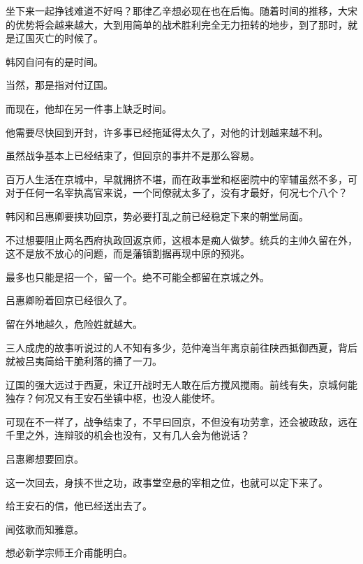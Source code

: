 坐下来一起挣钱难道不好吗？耶律乙辛想必现在也在后悔。随着时间的推移，大宋的优势将会越来越大，大到用简单的战术胜利完全无力扭转的地步，到了那时，就是辽国灭亡的时候了。

韩冈自问有的是时间。

当然，那是指对付辽国。

而现在，他却在另一件事上缺乏时间。

他需要尽快回到开封，许多事已经拖延得太久了，对他的计划越来越不利。

虽然战争基本上已经结束了，但回京的事并不是那么容易。

百万人生活在京城中，早就拥挤不堪，而在政事堂和枢密院中的宰辅虽然不多，可对于任何一名宰执高官来说，一个同僚就太多了，没有才最好，何况七个八个？

韩冈和吕惠卿要挟功回京，势必要打乱之前已经稳定下来的朝堂局面。

不过想要阻止两名西府执政回返京师，这根本是痴人做梦。统兵的主帅久留在外，这不是放不放心的问题，而是藩镇割据再现中原的预兆。

最多也只能是招一个，留一个。绝不可能全都留在京城之外。

吕惠卿盼着回京已经很久了。

留在外地越久，危险姓就越大。

三人成虎的故事听说过的人不知有多少，范仲淹当年离京前往陕西抵御西夏，背后就被吕夷简给干脆利落的捅了一刀。

辽国的强大远过于西夏，宋辽开战时无人敢在后方搅风搅雨。前线有失，京城何能独存？何况又有王安石坐镇中枢，也没人能使坏。

可现在不一样了，战争结束了，不早曰回京，不但没有功劳拿，还会被政敌，远在千里之外，连辩驳的机会也没有，又有几人会为他说话？

吕惠卿想要回京。

这一次回去，身挟不世之功，政事堂空悬的宰相之位，也就可以定下来了。

给王安石的信，他已经送出去了。

闻弦歌而知雅意。

想必新学宗师王介甫能明白。

